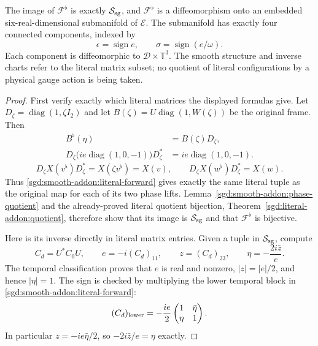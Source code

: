 \begin{theorem}
\label{sgd:smooth-addon:literal-diffeomorphism}
The image of $\mathcal F^\flat$ is exactly $\mathcal S_{\rm sg}$,
and $\mathcal F^\flat$ is a diffeomorphism onto an embedded
six-real-dimensional submanifold of $\mathcal E$.
The submanifold has exactly four connected components, indexed by
\[
 \epsilon=\operatorname{sign}e,\qquad
 \sigma=\operatorname{sign}(e/\omega).
\]
Each component is diffeomorphic to $\mathcal D\times\mathbb T^3$.
The smooth structure and inverse charts refer to the literal
matrix subset; no quotient of literal configurations by a physical
gauge action is being taken.
\end{theorem}
\begin{proof}
First verify exactly which literal matrices the displayed formulas give.
Let $D_\zeta=\operatorname{diag}(1,\zeta I_2)$ and let
$B(\zeta)=U\operatorname{diag}(1,W(\zeta))$ be the original frame.
Then
\begin{align*}
 B^\flat(\eta)&=B(\zeta)D_\zeta,\\
 D_\zeta\bigl(ie\operatorname{diag}(1,0,-1)\bigr)D_\zeta^*
       &=ie\operatorname{diag}(1,0,-1).
\end{align*}
\[
 D_\zeta X(v^\flat)D_\zeta^*=X(\zeta v^\flat)=X(v),
 \qquad D_\zeta X(w^\flat)D_\zeta^*=X(w).
\]
Thus \eqref{sgd:smooth-addon:literal-forward} gives exactly the same
literal tuple as the original map for each of its two phase lifts.
Lemma~\ref{sgd:smooth-addon:phase-quotient} and the already-proved
literal quotient bijection, Theorem~\ref{sgd:literal-addon:quotient},
therefore show that its image is $\mathcal S_{\rm sg}$ and that
$\mathcal F^\flat$ is bijective.

Here is its inverse directly in literal matrix entries.
Given a tuple in $\mathcal S_{\rm sg}$, compute
\begin{equation}
 C_d=U^*C_0U,\qquad
 e=-i(C_d)_{11},\qquad z=(C_d)_{23},\qquad
 \eta=-\frac{2i\bar z}{e}.
 \label{sgd:smooth-addon:literal-temporal-inverse}
\end{equation}
The temporal classification proves that $e$ is real and nonzero,
$|z|=|e|/2$, and hence $|\eta|=1$.
The sign is checked by multiplying the lower temporal block in
\eqref{sgd:smooth-addon:literal-forward}:
\[
 (C_d)_{\rm lower}
 =-\frac{ie}{2}\begin{pmatrix}1&\bar\eta\\\eta&1\end{pmatrix}.
\]
In particular $z=-ie\bar\eta/2$, so
$-2i\bar z/e=\eta$ exactly.


\end{proof}
